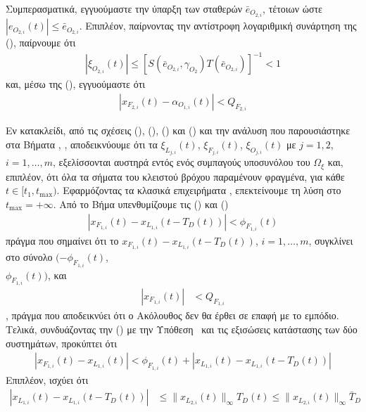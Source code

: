 \begin{proof_of_theorem}
\begin{step}
\bigskip
Συμπερασματικά, εγγυούμαστε την ύπαρξη των σταθερών $\bar{e}_{O_{2,i}}$, τέτοιων ώστε $|e_{O_{2,i}}(t)|\leq \bar{e}_{O_{2,i}}$. Επιπλέον, παίρνοντας την αντίστροφη λογαριθμική συνάρτηση της (), παίρνουμε ότι
\begin{align}
\left|\xi_{O_{2,i}}(t)\right| \leq [S(\bar{e}_{O_{2,i}},\gamma_{O_{2}})T(\bar{e}_{O_{2,i}})]^{-1} < 1 \label{xiO2abs}
\end{align}
και, μέσω της (), εγγυούμαστε ότι
\begin{align}
|x_{F_{2,i}}(t) - \alpha_{O_{1,i}}(t)| < Q_{F_{2,i}} \label{conclusionO2}
\end{align}

Εν κατακλείδι, από τις σχέσεις (), (), () και () και την ανάλυση που παρουσιάστηκε στα Βήματα , , αποδεικνύουμε ότι τα $\xi_{L_{j,i}}(t)$, $\xi_{F_{j,i}}(t)$, $\xi_{O_{j,i}}(t)$ με $j=1,2$, $i=1,\ldots,m$, εξελίσσονται αυστηρά εντός ενός συμπαγούς υποσυνόλου του $\Omega_{\xi}$ και, επιπλέον, ότι όλα τα σήματα του κλειστού βρόχου παραμένουν φραγμένα, για κάθε $t\in[t_1, t_{\text{max}})$. Εφαρμόζοντας τα κλασικά επιχειρήματα \cite{khalil2002nonlinear}, επεκτείνουμε τη λύση στο $t_{\text{max}} = +\infty$. Από το Βήμα  υπενθυμίζουμε τις () και ()
\begin{align*}
  \left| x_{F_{1,i}}(t) - x_{L_{1,i}}(t - T_D(t)) \right| < \phi_{F_{1,i}}(t)
\end{align*}
πράγμα που σημαίνει ότι το $x_{F_{1,i}}(t) - x_{L_{1,i}}(t - T_D(t))$, $i=1,\ldots,m$, συγκλίνει στο σύνολο $(-\phi_{F_{1,i}}(t)$, \\$ \phi_{F_{1,i}}(t))$, και
\begin{align*}
  |x_{F_{1, i}}(t)| &< Q_{F_{1,i}} 
\end{align*},
πράγμα που αποδεικνύει ότι ο Ακόλουθος δεν θα έρθει σε επαφή με το εμπόδιο.
Τελικά, συνδυάζοντας την () με την Υπόθεση~ και τις εξισώσεις κατάστασης των δύο συστημάτων, προκύπτει ότι
\begin{align}
|x_{F_{1,i}}(t) - x_{L_{1,i}}(t)| < \phi_{F_{1,i}}(t) + |x_{L_{1,i}}(t) - x_{L_{1,i}}(t-T_D(t))| \label{conclusion1}
\end{align}
Επιπλέον, ισχύει ότι
\begin{align}
|x_{L_{1,i}}(t) - x_{L_{1,i}}(t-T_D(t))| &\leq \| x_{L_{2,i}}(t) \|_{\infty} T_{D}(t) \leq \| x_{L_{2,i}}(t) \|_{\infty} \bar{T}_{D} \label{conclusion2}

\end{align}
\end{step}
\end{proof_of_theorem}
